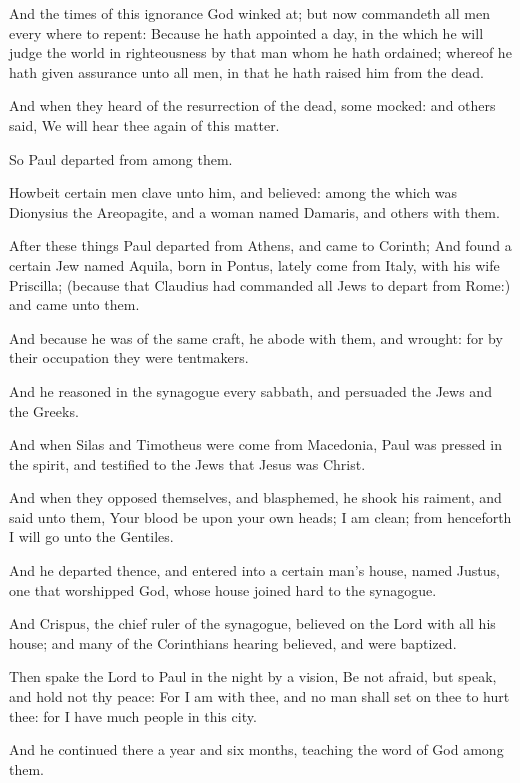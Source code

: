 \Verse And the times of this ignorance God winked at; but now commandeth all men every where to repent: \Verse Because he hath appointed a day, in the which he will judge the world in righteousness by that man whom he hath ordained; whereof he hath given assurance unto all men, in that he hath raised him from the dead.

\Verse And when they heard of the resurrection of the dead, some mocked: and others said, We will hear thee again of this matter.

\Verse So Paul departed from among them.

\Verse Howbeit certain men clave unto him, and believed: among the which was Dionysius the Areopagite, and a woman named Damaris, and others with them.


\Chapter
\Verse After these things Paul departed from Athens, and came to Corinth; \Verse And found a certain Jew named Aquila, born in Pontus, lately come from Italy, with his wife Priscilla; (because that Claudius had commanded all Jews to depart from Rome:) and came unto them.

\Verse And because he was of the same craft, he abode with them, and wrought: for by their occupation they were tentmakers.

\Verse And he reasoned in the synagogue every sabbath, and persuaded the Jews and the Greeks.

\Verse And when Silas and Timotheus were come from Macedonia, Paul was pressed in the spirit, and testified to the Jews that Jesus was Christ.

\Verse And when they opposed themselves, and blasphemed, he shook his raiment, and said unto them, Your blood be upon your own heads; I am clean; from henceforth I will go unto the Gentiles.

\Verse And he departed thence, and entered into a certain man's house, named Justus, one that worshipped God, whose house joined hard to the synagogue.

\Verse And Crispus, the chief ruler of the synagogue, believed on the Lord with all his house; and many of the Corinthians hearing believed, and were baptized.

\Verse Then spake the Lord to Paul in the night by a vision, Be not afraid, but speak, and hold not thy peace: \Verse For I am with thee, and no man shall set on thee to hurt thee: for I have much people in this city.

\Verse And he continued there a year and six months, teaching the word of God among them.


